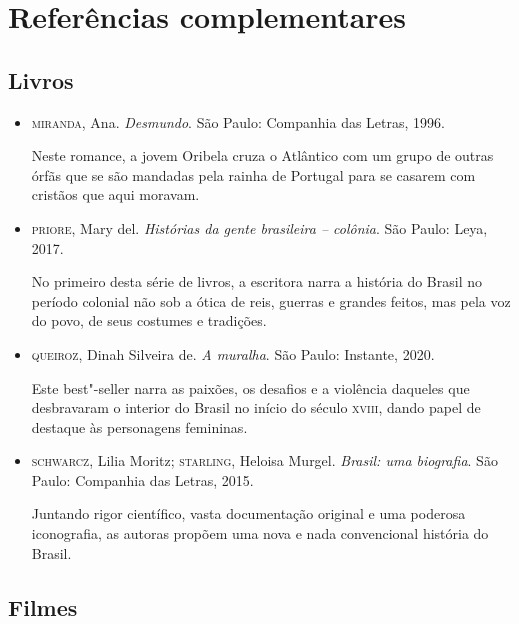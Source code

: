 \documentclass[12pt]{extarticle}
\begin{document}

\section{Referências complementares}

\subsection{Livros}

\begin{itemize}
\item\textsc{miranda}, Ana. \textit{Desmundo}. São Paulo: Companhia das Letras, 1996.

Neste romance, a jovem Oribela cruza o Atlântico com um grupo de outras
órfãs que se são mandadas pela rainha de Portugal para se casarem com
cristãos que aqui moravam.

\item\textsc{priore}, Mary del. \textit{Histórias da gente brasileira -- colônia}. São Paulo: Leya, 2017.

No primeiro desta série de livros, a escritora narra a história do
Brasil no período colonial não sob a ótica de reis, guerras e grandes
feitos, mas pela voz do povo, de seus costumes e tradições.

\item\textsc{queiroz}, Dinah Silveira de. \textit{A muralha}. São Paulo: Instante,
2020.

Este best"-seller narra as paixões, os desafios e a violência daqueles
que desbravaram o interior do Brasil no início do século \textsc{xviii}, dando
papel de destaque às personagens femininas.

\item\textsc{schwarcz}, Lilia Moritz; \textsc{starling}, Heloisa Murgel. \textit{Brasil: uma biografia}. São Paulo: Companhia das Letras, 2015.

Juntando rigor científico, vasta documentação original e uma poderosa
iconografia, as autoras propõem uma nova e nada convencional história do
Brasil.
\end{itemize}

\subsection{Filmes}
\end{document}
